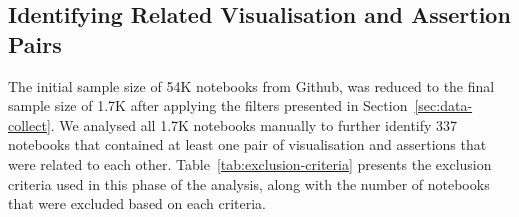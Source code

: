 \documentclass[acmsmall,screen,review,anonymous]{acmart}
\begin{document}
\subsection{Identifying Related Visualisation and Assertion Pairs}\label{sec:identify-related-pairs}

The initial sample size of 54K notebooks from Github, was reduced to the final sample size of 1.7K after applying the filters presented in Section~\ref{sec:data-collect}. We analysed all 1.7K notebooks manually to further identify 337 notebooks that contained at least one pair of visualisation and assertions that were related to each other. Table~\ref{tab:exclusion-criteria} presents the exclusion criteria used in this phase of the analysis, along with the number of notebooks that were excluded based on each criteria.
\end{document}
